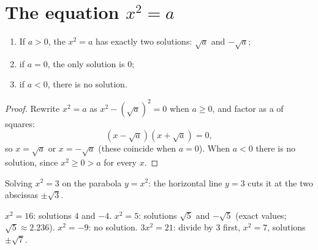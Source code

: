 \section{The equation \texorpdfstring{$x^2 = a$}{x2 = a}}

\begin{theorem}[Solving $x^2 = a$]\label{thm:g9:sqrt:equation}
\begin{enumerate}
  \item If $a > 0$, the  $x^2 = a$ has exactly two solutions:
        $\sqrt a$ and $-\sqrt a$;
  \item if $a = 0$, the only solution is $0$;
  \item if $a < 0$, there is no solution.
\end{enumerate}
\end{theorem}

\begin{proof}
Rewrite $x^2 = a$ as $x^2 - \left(\sqrt a\right)^2 = 0$ when $a \geq 0$,
and factor as a  of squares:
\[
\left(x - \sqrt a\right)\left(x + \sqrt a\right) = 0 ,
\]
so $x = \sqrt a$ or $x = -\sqrt a$ (these coincide when $a = 0$). When
$a < 0$ there is no solution, since $x^2 \geq 0 > a$ for every $x$.
\end{proof}

\begin{omfigure}

{\small Solving $x^2 = 3$ on the parabola $y = x^2$: the horizontal line
$y = 3$ cuts it at the two abscissas $\pm\sqrt3$.}
\end{omfigure}

\begin{example}
$x^2 = 16$: solutions $4$ and $-4$. \quad
$x^2 = 5$: solutions $\sqrt5$ and $-\sqrt5$ (exact values; $\sqrt5
\approx 2.236$). \quad
$x^2 = -9$: no solution. \quad
$3x^2 = 21$: divide by 3 first, $x^2 = 7$, solutions $\pm\sqrt7$.
\end{example}

